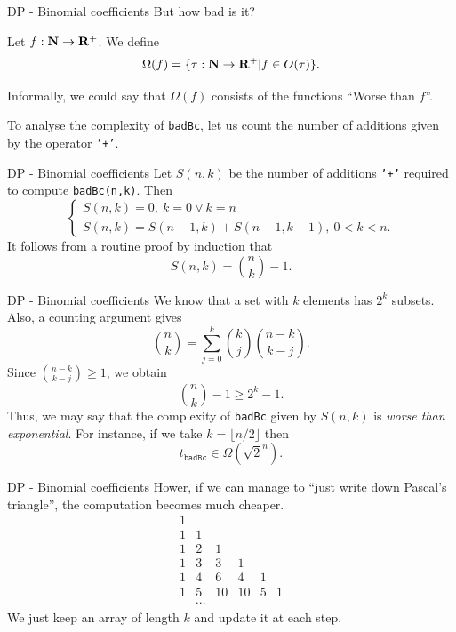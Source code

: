 \documentclass{beamer}
\begin{document}
%

\begin{frame}{DP - Binomial coefficients}
	But how bad is it?
	\begin{defn}
		Let $f : \mathbf{N} \to \mathbf{R}^+$. We define
		\[
			\Omega(f)= \{\tau : \mathbf{N} \to \mathbf{R}^+ | f \in O(\tau)\}.
		\]
	\end{defn}
	Informally, we could say that $\Omega(f)$ consists of the functions
	``Worse than $f$''.

	\bigskip
	To analyse the complexity of \texttt{badBc}, let us count the number of
	additions given by the operator \texttt{'+'}.
\end{frame}

%

\begin{frame}{DP - Binomial coefficients}
	Let $S(n,k)$ be the number of additions \texttt{'+'} required to compute
	\texttt{badBc(n,k)}. Then
	\[
		\begin{cases}
			S(n,k) = 0,\ k = 0 \lor k = n\\
			S(n,k) = S(n-1,k) + S(n-1,k-1),\ 0 < k < n.
		\end{cases}
	\]
	It follows from a routine proof by induction that
		\[
			S(n,k) = \binom{n}{k} - 1.
		\] 
\end{frame}

%

\begin{frame}{DP - Binomial coefficients}
	We know that a set with $k$ elements has $2^k$ subsets. Also, a counting
	argument gives
	\[
		\binom{n}{k} = \sum_{j= 0}^k \binom{k}{j} \binom{n-k}{k-j}.
	\]
	Since $\binom{n-k}{k-j} \geq 1$, we obtain
	\[
		\binom{n}{k} - 1 \geq 2^k - 1.
	\]
	Thus, we may say that the complexity of \texttt{badBc} given by $S(n,k)$ is
	\emph{worse than exponential}. For instance, if we take $k= \lfloor n/2
	\rfloor$ then 
	\[
		t_{\texttt{badBc}} \in \Omega(\sqrt{2}^n).
	\]
\end{frame}

%

\begin{frame}{DP - Binomial coefficients}
	Hower, if we can manage to ``just write down Pascal's triangle'', the
	computation becomes much cheaper.
	\[
		\begin{array}{cccccc}
			1 & & & & & \\
			1 & 1 & & & & \\ 
			1 & 2 & 1 & & & \\ 
			1 & 3 & 3 & 1 & & \\ 
			1 & 4 & 6 & 4 & 1 & \\ 
			1 & 5 & 10 & 10 & 5 & 1\\
			 & \cdots & & & & 
		\end{array}
	\]
	We just keep an array of length $k$ and update it at each step.
\end{frame}
\end{document}
